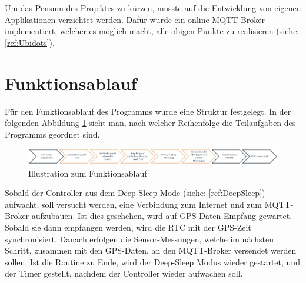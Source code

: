         Um das Pensum des Projektes zu kürzen, musste auf die Entwicklung von eigenen Applikationen verzichtet werden. Dafür wurde ein online MQTT-Broker implementiert, welcher es möglich macht, alle obigen Punkte zu realisieren (siehe: \ref{ref:Ubidots}).
        
         
    \section{Funktionsablauf} \label{ref:FnktAb}
    
        Für den Funktionsablauf des Programms wurde eine Struktur festgelegt. In der folgenden Abbildung \ref{fig:FnktAb} sieht man, nach welcher Reihenfolge die Teilaufgaben des Programms geordnet sind. 
    
         \begin{figure}[H]
            \centering
            \includegraphics[width=1\textwidth]{./media/images/FnktAb.jpg}
            \caption{Illustration zum Funktionsablauf}
            \label{fig:FnktAb}
        \end{figure}
        
        Sobald der Controller aus dem Deep-Sleep Mode (siehe: \ref{ref:DeepSleep}) aufwacht, soll versucht werden, eine Verbindung zum Internet und zum MQTT-Broker aufzubauen. Ist dies geschehen, wird auf GPS-Daten Empfang gewartet. Sobald sie dann empfangen werden, wird die RTC mit der GPS-Zeit synchronisiert. Danach erfolgen die Sensor-Messungen, welche im nächsten Schritt, zusammen mit den GPS-Daten, an den MQTT-Broker versendet werden sollen. Ist die Routine zu Ende, wird der Deep-Sleep Modus wieder gestartet, und der Timer gestellt, nachdem der Controller wieder aufwachen soll.  
         
